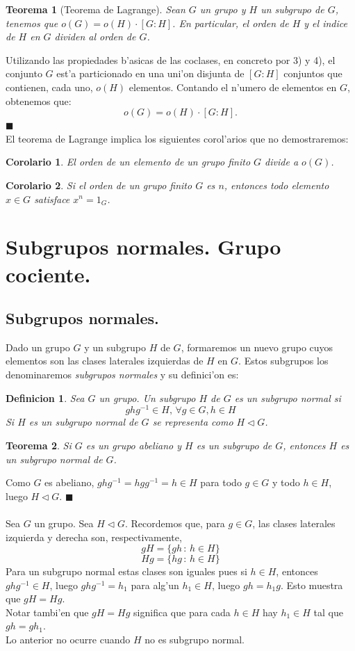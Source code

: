 \documentclass[a4paper,openright,12pt]{report}
\numberwithin{equation}{section} %
\newtheorem{teorema}{Teorema}[section] %
\newtheorem{corolario}{Corolario}[section] %
\newtheorem{definicion}{Definicion}[section] %
\newenvironment{proof}{\noindent{\it Demostracion:}}{\hfill$\blacksquare$} %
\begin{document}
\begin{teorema}[Teorema de Lagrange]
Sean $G$ un grupo y $H$ un subgrupo de $G$, tenemos que $o(G)=o(H)\cdot [G:H]$. En particular, el orden de $H$ y el indice de $H$ en $G$ dividen al orden de $G$.
\end{teorema}
\begin{proof}
Utilizando las propiedades b'asicas de las coclases, en concreto por 3) y 4), el conjunto $G$ est'a particionado en una uni'on disjunta de $[G:H]$ conjuntos que contienen, cada uno, $o(H)$ elementos. Contando el n'umero de elementos en $G$, obtenemos que:
\[
 o(G)=o(H)\cdot [G:H].
 \]
\end{proof}
\\
El teorema de Lagrange implica los siguientes corol'arios que no demostraremos:
\begin{corolario}
El orden de un elemento de un grupo finito $G$ divide a $o(G)$.
\end{corolario}
\begin{corolario}
Si el orden de un grupo finito $G$ es $n$, entonces todo elemento $x \in G$ satisface $x^{n}=1_{G}$.
\end{corolario}
\section{Subgrupos normales. Grupo cociente.}
\subsection{Subgrupos normales.}
Dado un grupo $G$ y un subgrupo $H$ de $G$, formaremos un nuevo grupo cuyos elementos son las clases laterales izquierdas de $H$ en $G$. Estos subgrupos los denominaremos \textit{subgrupos normales} y su definici'on es:
\begin{definicion}
Sea $G$ un grupo. Un subgrupo $H$ de $G$ es un subgrupo normal si
\[
ghg^{-1}\in H, \, \forall g\in G, h\in H
\]
Si $H$ es un subgrupo normal de $G$ se representa como $H \triangleleft G$.
\end{definicion}
\begin{teorema}
Si $G$ es un grupo abeliano y $H$ es un subgrupo de $G$, entonces $H$ es un subgrupo normal de $G$.
\end{teorema}
\begin{proof}
Como $G$ es abeliano, $ghg^{-1}=hgg^{-1}=h \in H$ para todo $g \in G$ y todo $h \in H$, luego $H \triangleleft G$.
\end{proof}
\\
\\
Sea $G$ un grupo. Sea $H \triangleleft G$. Recordemos que, para $g \in G$, las clases laterales izquierda y derecha son, respectivamente,
\[
gH=\{gh\,:\, h\in H\}
\]
\[
Hg=\{hg\,:\, h \in H\}
\]
Para un subgrupo normal estas clases son iguales pues si $h\in H$, entonces $ghg^{-1} \in H$, luego $ghg^{-1}=h_{1}$ para alg'un $h_{1} \in H$, luego $gh=h_{1}g$. Esto muestra que $gH=Hg$.\\
Notar tambi'en que $gH=Hg$ significa que para cada $h \in H$ hay $h_{1} \in H$ tal que $gh=gh_{1}$.\\
Lo anterior no ocurre cuando $H$ no es subgrupo normal.
\end{document}
